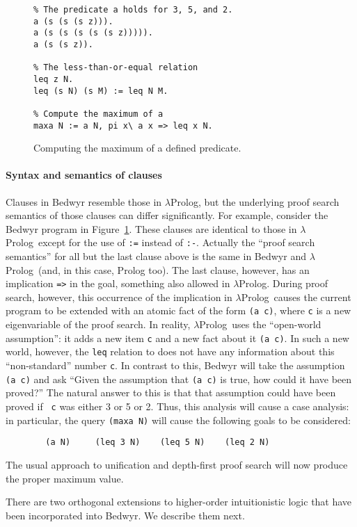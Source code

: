 \documentclass{article}
\newcommand{\lp}{$\lambda$Prolog}
\begin{document}
\begin{figure}
\begin{verbatim}
% The predicate a holds for 3, 5, and 2.
a (s (s (s z))).
a (s (s (s (s (s z))))).
a (s (s z)).

% The less-than-or-equal relation
leq z N.
leq (s N) (s M) := leq N M.

% Compute the maximum of a
maxa N := a N, pi x\ a x => leq x N.
\end{verbatim}
\caption{Computing the maximum of a defined predicate.}
\label{maxa}
\end{figure}

\paragraph{Syntax and semantics of clauses}
Clauses in Bedwyr resemble those in \lp, but the underlying proof
search semantics of those clauses can differ significantly.  For example,
consider the Bedwyr program in Figure~\ref{maxa}.  These clauses are
identical to those in \lp\ except for the use of \verb+:=+ instead of
\verb+:-+.  Actually the ``proof search semantics'' for all but the
last clause above is the same in Bedwyr and \lp\ (and, in this case,
Prolog too).  The last clause, however, has an implication \verb+=>+
in the goal, something also allowed in \lp.  During proof search,
however, this occurrence of the implication in \lp\ causes the current
program to be extended with an atomic fact of the form \verb+(a c)+,
where {\tt c} is a new eigenvariable of the proof search.  In reality,
\lp\ uses the ``open-world assumption'': it adds a new item {\tt c}
and a new fact about it {\tt (a c)}.  In such a new world, however, the 
{\tt leq} relation to does not have any information about this
``non-standard'' number {\tt c}.  In contrast to this, Bedwyr will
take the assumption  {\tt (a c)} and ask ``Given the assumption that 
{\tt (a c)} is true, how could it have been proved?''  The natural
answer to this is that that assumption could have been proved if {\tt
c} was either 3 or 5 or 2.  Thus, this analysis will cause a case
analysis: in particular, the query {\tt (maxa N)} will cause the
following goals to be considered:
\begin{verbatim}
        (a N)     (leq 3 N)    (leq 5 N)    (leq 2 N)
\end{verbatim}
The usual approach to unification and depth-first proof search will
now produce the proper maximum value.

\bigskip
There are two orthogonal extensions to higher-order intuitionistic
logic that have been incorporated into Bedwyr.   We describe them next.
\end{document}
